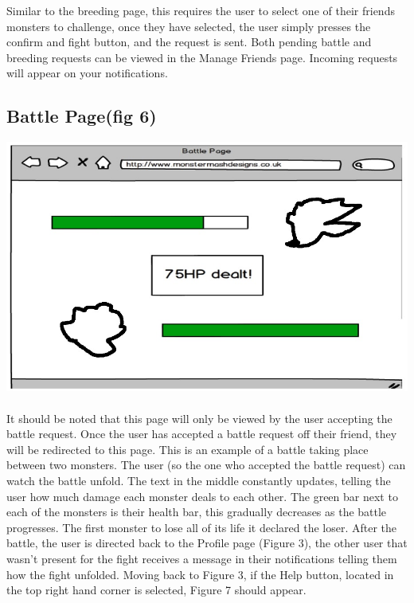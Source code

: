 \documentclass{project}
\begin{document}
Similar to the breeding page, this requires the user to select one of their friends
monsters to challenge, once they have selected, the user simply presses the confirm
and fight button, and the request is sent.
Both pending battle and breeding requests can be viewed in the Manage Friends
page. Incoming requests will appear on your notifications.

\subsection{Battle Page(fig 6)}
\includegraphics[scale=0.5]{battle.jpg}
\\
\\
It should be noted that this page will only be viewed by the user accepting the battle
request. Once the user has accepted a battle request off their friend, they will be
redirected to this page.
This is an example of a battle taking place between two monsters. The user (so
the one who accepted the battle request) can watch the battle unfold. The text
in the middle constantly updates, telling the user how much damage each monster
deals to each other. The green bar next to each of the monsters is their health bar,
this gradually decreases as the battle progresses. The first monster to lose all of its
life it declared the loser. After the battle, the user is directed back to the Profile
page (Figure 3), the other user that wasn't present for the fight receives a message
in their notifications telling them how the fight unfolded.
Moving back to Figure 3, if the Help button, located in the top right hand corner
is selected, Figure 7 should appear.
\end{document}

